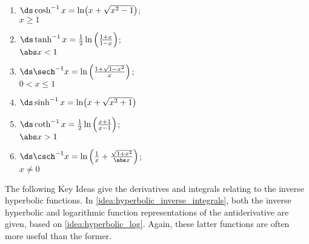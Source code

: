 {
\begin{keyidea}\label{idea:hyperbolic_log}
\mbox{}\\[-2\baselineskip]%
%
\begin{multicols}{2}
\begin{enumerate}
\item $\ds\cosh^{-1}x=\ln\bigl(x+\sqrt{x^2-1}\bigr)$;\\\null\qquad $x\geq1$
\item $\ds\tanh^{-1}x=\frac12\ln\left(\frac{1+x}{1-x}\right)$;\\\null\qquad$\abs x<1$
\item $\ds\sech^{-1}x=\ln\left(\frac{1+\sqrt{1-x^2}}x\right)$;\\\null\qquad$0<x\leq1$
\item $\ds\sinh^{-1}x=\ln\bigl(x+\sqrt{x^2+1}\bigr)$\\\mbox{}
\item $\ds\coth^{-1}x=\frac12\ln\left(\frac{x+1}{x-1}\right)$;\\\null\qquad$\abs x>1$
\item $\ds\csch^{-1}x=\ln\left(\frac1x+\frac{\sqrt{1+x^2}}{\abs x}\right)$;\\\null\qquad $x\neq0$
\end{enumerate}
\end{multicols}
\end{keyidea}
}

The following Key Ideas give the derivatives and integrals relating to the inverse hyperbolic functions. In \autoref{idea:hyperbolic_inverse_integrals}, both the inverse hyperbolic and logarithmic function representations of the antiderivative are given, based on \autoref{idea:hyperbolic_log}. Again, these latter functions are often more useful than the former.




